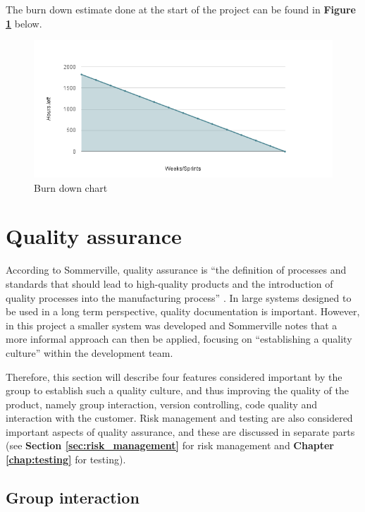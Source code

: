 The burn down estimate done at the start of the project can be found in \textbf{Figure \ref{Fig:burndownstart}} below. 



\begin{figure}[h!]
	\centering
	\includegraphics[width=\textwidth]{fig/burndownstart}
	\caption{Burn down chart}
	\label{Fig:burndownstart}
\end{figure}


\section{Quality assurance}

According to Sommerville, quality assurance is “the definition of processes and standards that should lead to high-quality products and the introduction of quality processes into the manufacturing process” \cite[p.652]{Sommerville}. In large systems designed to be used in a long term perspective, quality documentation is important. However, in this project a smaller system was developed and Sommerville notes that a more informal approach can then be applied, focusing on “establishing a quality culture” \cite[p.654]{Sommerville} within the development team.\newline

Therefore, this section will describe four features considered important by the group to establish such a quality culture, and thus improving the quality of the product, namely group interaction, version controlling, code quality and interaction with the customer. Risk management and testing are also considered important aspects of quality assurance, and these are discussed in separate parts (see \textbf{Section \ref{sec:risk_management}} for risk management and \textbf{Chapter \ref{chap:testing}} for testing). 

\subsection{Group interaction}

